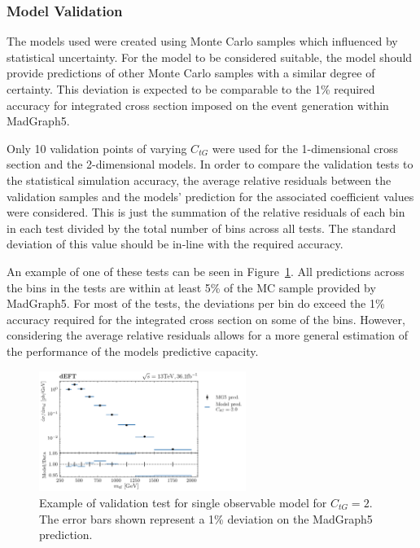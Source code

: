 \documentclass[a4paper,11pt]{article}
\begin{document}
\subsubsection{Model Validation}

The models used were created using Monte Carlo samples which influenced by statistical uncertainty.
For the model to be considered suitable, the model should provide predictions of other Monte Carlo samples with a similar degree of certainty.
This deviation is expected to be comparable to the 1\% required accuracy for integrated cross section imposed on the event generation within MadGraph5.


Only 10 validation points of varying $C_{tG}$ were used for the 1-dimensional cross section and the 2-dimensional models.
In order to compare the validation tests to the statistical simulation accuracy, the average relative residuals between the validation samples and the models' prediction for the associated coefficient values were considered.
This is just the summation of the relative residuals of each bin in each test divided by the total number of bins across all tests.
The standard deviation of this value should be in-line with the required accuracy.

An example of one of these tests can be seen in Figure~\ref{fig:test_example}. All predictions across the bins in the tests are within at least 5\% of the MC sample provided by MadGraph5.
For most of the tests, the deviations per bin do exceed the 1\% accuracy required for the integrated cross section on some of the bins.
However, considering the average relative residuals allows for a more general estimation of the performance of the models predictive capacity.

\begin{figure}[htb]
    \centering
    \includegraphics[width=0.6\textwidth]{plots/validation_ATLAS-ctg_2_1D_1OP.png}
    \caption{Example of validation test for single observable model for $C_{tG}=2$. The error bars shown represent a 1\% deviation on the MadGraph5 prediction.}
    \label{fig:test_example}
\end{figure}
\end{document}
